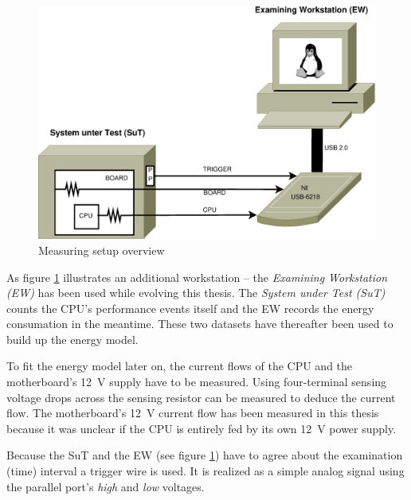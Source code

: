 \label{sec:design}


\label{sec:big-pic}

\begin{figure}
  \centering
    \includegraphics[width=\textwidth]{fig/measuring-overview.eps}
  \caption{Measuring setup overview}
  \label{fig:overview}
\end{figure}

As figure \ref{fig:overview} illustrates an additional workstation -- the
\emph{Examining Workstation (EW)} has been used while evolving this thesis. The
\emph{System under Test (SuT)} counts the CPU's performance events itself and
the EW records the energy consumation in the meantime. These two datasets have
thereafter been used to build up the energy model.


\label{sec:measuring-setup}

To fit the energy model later on, the current flows of the CPU and the
motherboard's \SI{12}{\volt} supply have to be measured. Using four-terminal
sensing \cite{wiki:FTS} voltage drops across the sensing resistor can be
measured to deduce the current flow. The motherboard's \SI{12}{\volt} current
flow has been measured in this thesis because it was unclear if the CPU is
entirely fed by its own \SI{12}{\volt} power supply.

Because the SuT and the EW (see figure \ref{fig:overview}) have to agree about
the examination (time) interval a trigger wire is used. It is realized as a
simple analog signal using the parallel port's \emph{high} and \emph{low}
voltages.

